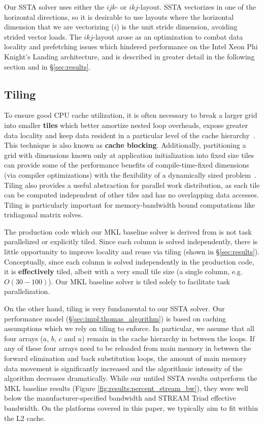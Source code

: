 \documentclass[10pt, conference, compsocconf]{IEEEtran}
\begin{document}
Our SSTA solver uses either the \(ijk\)- or \(ikj\)-layout.
SSTA vectorizes in one of the horizontal directions, so it is
  desirable to use layouts where the horizontal dimension that we are
  vectorizing (\(i\)) is the unit stride dimension, avoiding strided vector loads.
The \(ikj\)-layout arose as an optimization to combat data locality and
  prefetching issues which hindered performance on the Intel Xeon Phi Knight's
  Landing architecture, and is described in greater detail in the following
  section and in \S\ref{sec:results}.

\subsection{Tiling}
\label{sec:impl:tiling}

To ensure good CPU cache utilization, it is often necessary to break a larger
  grid into smaller \textbf{tiles} which better amortize nested loop overheads, expose
  greater data locality and keep data resident in a particular level of the
  cache hierarchy~\cite{cache_blocking}.
This technique is also known as \textbf{cache blocking}.
Additionally, partitioning a grid with dimensions known only at application
  initialization into fixed size tiles can provide some of the performance
  benefits of compile-time-fixed dimensions (via compiler optimizations) with
  the flexibility of a dynamically sized problem~\cite{kokkos}.
Tiling also provides a useful abstraction for parallel work distribution, as
  each tile can be computed independent of other tiles and has no overlapping
  data accesses.
Tiling is particularly important for memory-bandwidth bound computations like
  tridiagonal matrix solves.

The production code which our MKL baseline solver is derived from is not task
  parallelized or explicitly tiled.
Since each column is solved independently, there is little opportunity to improve
  locality and reuse via tiling (shown in \S\ref{sec:results}).
Conceptually, since each column is solved independently in the production code,
  it is \textbf{effectively} tiled, albeit with a very small tile size (a single
  column, e.g. \(O(30-100)\)).
Our MKL baseline solver is tiled solely to facilitate task parallelization.

On the other hand, tiling is very fundamental to our SSTA solver.
Our performance model (\S\ref{sec:impl:thomas_algorithm})
  is based on caching assumptions which we rely on tiling to enforce.
In particular, we assume that all four arrays (\(a\), \(b\), \(c\) and \(u\))
  remain in the cache hierarchy in between the loops. 
If any of these four arrays need to be reloaded from main memory in between the
  forward elimination and back substitution loops, the amount of main memory data
  movement is significantly increased and the algorithmic intensity of the
  algorithm decreases dramatically.
While our untiled SSTA results outperform the MKL baseline results (Figure
  \ref{fig:results:percent_stream_bw}), they were well below the manufacturer-specified
  bandwidth and STREAM Triad effective bandwidth.
On the platforms covered in this paper, we typically aim to fit within the L2
  cache.
\end{document}
